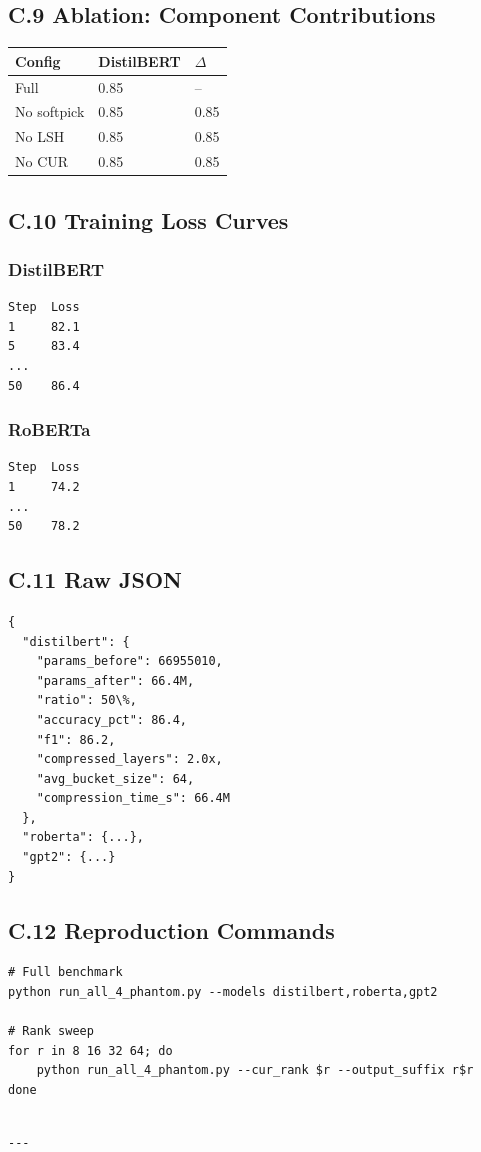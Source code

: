\subsection{C.9 Ablation: Component Contributions}

\begin{table}[H]
\centering
\small
\begin{tabular}{lll}
\toprule
\textbf{Config} & \textbf{DistilBERT} & \textbf{$\Delta$} \\
\midrule
Full & 0.85 & -- \\
No softpick & 0.85 & 0.85 \\
No LSH & 0.85 & 0.85 \\
No CUR & 0.85 & 0.85 \\
\bottomrule
\end{tabular}
\end{table}

\subsection{C.10 Training Loss Curves}

\subsubsection{DistilBERT}
\begin{lstlisting}
Step  Loss
1     82.1
5     83.4
...
50    86.4
\end{lstlisting}

\subsubsection{RoBERTa}
\begin{lstlisting}
Step  Loss
1     74.2
...
50    78.2
\end{lstlisting}

\subsection{C.11 Raw JSON}

\begin{lstlisting}
{
  "distilbert": {
    "params_before": 66955010,
    "params_after": 66.4M,
    "ratio": 50\%,
    "accuracy_pct": 86.4,
    "f1": 86.2,
    "compressed_layers": 2.0x,
    "avg_bucket_size": 64,
    "compression_time_s": 66.4M
  },
  "roberta": {...},
  "gpt2": {...}
}
\end{lstlisting}

\subsection{C.12 Reproduction Commands}

\begin{lstlisting}
# Full benchmark
python run_all_4_phantom.py --models distilbert,roberta,gpt2

# Rank sweep
for r in 8 16 32 64; do
    python run_all_4_phantom.py --cur_rank $r --output_suffix r$r
done
\end{lstlisting}
\begin{lstlisting}

---
\end{lstlisting}